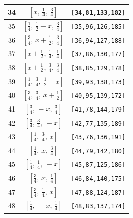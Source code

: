 \documentclass[fleqn,8pt]{jsarticle}
\begin{document}
\begin{longtable}{ccc}
34 & $\left[ x,\, \frac{1}{4},\, \frac{3}{4} \right]$ & {\tt [34,81,133,182]} \\ \hline
35 & $\left[ \frac{1}{4},\, \frac{1}{2} - x,\, \frac{3}{4} \right]$ & {\tt [35,96,126,185]} \\ \hline
36 & $\left[ \frac{3}{4},\, x + \frac{1}{2},\, \frac{3}{4} \right]$ & {\tt [36,94,127,188]} \\ \hline
37 & $\left[ x + \frac{1}{2},\, \frac{1}{4},\, \frac{1}{4} \right]$ & {\tt [37,86,130,177]} \\ \hline
38 & $\left[ x + \frac{1}{2},\, \frac{3}{4},\, \frac{3}{4} \right]$ & {\tt [38,85,129,178]} \\ \hline
39 & $\left[ \frac{1}{4},\, \frac{3}{4},\, \frac{1}{2} - x \right]$ & {\tt [39,93,138,173]} \\ \hline
40 & $\left[ \frac{3}{4},\, \frac{3}{4},\, x + \frac{1}{2} \right]$ & {\tt [40,95,139,172]} \\ \hline
41 & $\left[ \frac{3}{4},\, - x,\, \frac{3}{4} \right]$ & {\tt [41,78,144,179]} \\ \hline
42 & $\left[ \frac{3}{4},\, \frac{3}{4},\, - x \right]$ & {\tt [42,77,135,189]} \\ \hline
43 & $\left[ \frac{1}{4},\, \frac{3}{4},\, x \right]$ & {\tt [43,76,136,191]} \\ \hline
44 & $\left[ \frac{1}{4},\, x,\, \frac{3}{4} \right]$ & {\tt [44,79,142,180]} \\ \hline
45 & $\left[ \frac{1}{4},\, \frac{1}{4},\, - x \right]$ & {\tt [45,87,125,186]} \\ \hline
46 & $\left[ \frac{3}{4},\, x,\, \frac{1}{4} \right]$ & {\tt [46,84,140,175]} \\ \hline
47 & $\left[ \frac{3}{4},\, \frac{1}{4},\, x \right]$ & {\tt [47,88,124,187]} \\ \hline
48 & $\left[ \frac{1}{4},\, - x,\, \frac{1}{4} \right]$ & {\tt [48,83,137,174]} \\
\end{longtable}
\renewcommand{\arraystretch}{1.2}
\end{document}
